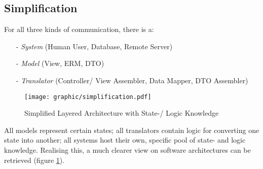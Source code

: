 %
%
%
%
%
%
%

\subsection{Simplification}
\label{simplification_heading}

For all three kinds of communication, there is a:

\begin{itemize}
    \item[-] \emph{System} (Human User, Database, Remote Server)
    \item[-] \emph{Model} (View, ERM, DTO)
    \item[-] \emph{Translator} (Controller/ View Assembler, Data Mapper, DTO Assembler)
\end{itemize}

\begin{figure}[ht]
    \begin{center}
        \texttt{[image: graphic/simplification.pdf]}
        \caption{Simplified Layered Architecture with State-/ Logic Knowledge}
        \label{simplification_figure}
    \end{center}
\end{figure}

All models represent certain states; all translators contain logic for
converting one state into another; all systems host their own, specific pool of
state- and logic knowledge. Realising this, a much clearer view on software
architectures can be retrieved (figure \ref{simplification_figure}).

